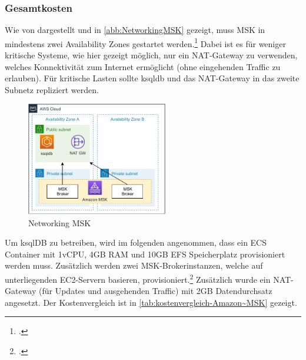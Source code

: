 \subsubsection{Gesamtkosten}
Wie von \citeauthor{Beswick.2020} dargestellt und in \autoref{abb:NetworkingMSK} gezeigt, muss MSK in mindestens zwei Availability Zones gestartet werden.\footcite[Vgl. auch im Folgenden][]{Beswick.2020} Dabei ist es für weniger kritische Systeme, wie hier gezeigt möglich, nur ein \ac{NAT}-Gateway zu verwenden, welches Konnektivität zum Internet ermöglicht (ohne eingehenden Traffic zu erlauben). Für kritische Lasten sollte ksqldb und das \ac{NAT}-Gateway in das zweite Subnetz repliziert werden.
\begin{figure}[H]
\centering
\includegraphics[width=0.55\textwidth]{graphics/MSK-Networking.pdf}
\caption{Networking MSK}
\label{abb:NetworkingMSK}
\end{figure}

Um ksqlDB zu betreiben, wird im folgenden angenommen, dass ein \acf{ECS} Container mit 1vCPU, 4GB \ac{RAM} und 10GB \ac{EFS} Speicherplatz provisioniert werden muss. Zusätzlich werden zwei \ac{MSK}-Brokerinstanzen, welche auf unterliegenden \ac{EC2}-Servern basieren, provisioniert.\footcite[Vgl.][]{AmazonWebServicesInc..o.J.o} Zusätzlich wurde ein \ac{NAT}-Gateway (für Updates und ausgehenden Traffic) mit 2GB Datendurchsatz angesetzt. Der Kostenvergleich ist in \autoref{tab:kostenvergleich-Amazon~MSK} gezeigt.


